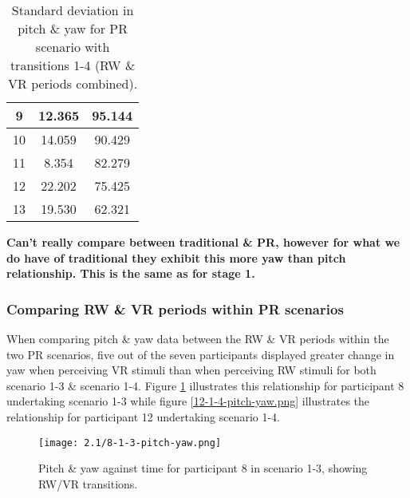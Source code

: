 \begin{table}
\begin{center}
\begin{minipage}[t]{.47\linewidth}
\begin{center}
\begin{tabular}{|c|c|c|}
\hline

9 & 12.365 & 95.144 \\

\hline

10 & 14.059 & 90.429 \\

\hline

11 & 8.354 & 82.279 \\

\hline

12 & 22.202 & 75.425 \\

\hline

13 & 19.530 & 62.321 \\

\hline
\end{tabular}
\caption{Standard deviation in pitch \& yaw for PR scenario with transitions 1-4 (RW \& VR periods combined).}
\label{2-1-sd-1-4}
\end{center}
\end{minipage}
\end{center}
\end{table}

\textbf{Can't really compare between traditional \& PR, however for what we do have of traditional they exhibit this more yaw than pitch relationship. This is the same as for stage 1.}


\subsubsection{Comparing RW \& VR periods within PR scenarios}

When comparing pitch \& yaw data between the RW \& VR periods within the two PR scenarios, five out of the seven participants displayed greater change in yaw when perceiving VR stimuli than when perceiving RW stimuli for both scenario 1-3 \& scenario 1-4. Figure \ref{8-1-3-pitch-yaw.png} illustrates this relationship for participant 8 undertaking scenario 1-3 while figure \ref{12-1-4-pitch-yaw.png} illustrates the relationship for participant 12 undertaking scenario 1-4.

\begin{figure}[h]
	\begin{center}
	\texttt{[image: 2.1/8-1-3-pitch-yaw.png]}
	\caption{Pitch \& yaw against time for participant 8 in scenario 1-3, showing RW/VR transitions.}
	\label{8-1-3-pitch-yaw.png}
	\end{center}
\end{figure}

